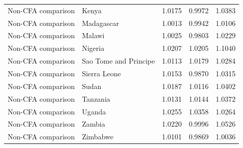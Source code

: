 \begin{table}
\begin{tabular}[t]{llrrr}
Non-CFA comparison & Kenya & 1.0175 & 0.9972 & 1.0383\\
\addlinespace
Non-CFA comparison & Madagascar & 1.0013 & 0.9942 & 1.0106\\
Non-CFA comparison & Malawi & 1.0025 & 0.9803 & 1.0229\\
Non-CFA comparison & Nigeria & 1.0207 & 1.0205 & 1.1040\\
Non-CFA comparison & Sao Tome and Principe & 1.0113 & 1.0179 & 1.0284\\
Non-CFA comparison & Sierra Leone & 1.0153 & 0.9870 & 1.0315\\
\addlinespace
Non-CFA comparison & Sudan & 1.0187 & 1.0116 & 1.0402\\
Non-CFA comparison & Tanzania & 1.0131 & 1.0144 & 1.0372\\
Non-CFA comparison & Uganda & 1.0255 & 1.0358 & 1.0264\\
Non-CFA comparison & Zambia & 1.0220 & 0.9996 & 1.0526\\
Non-CFA comparison & Zimbabwe & 1.0101 & 0.9869 & 1.0036\\
\bottomrule
\end{tabular}
\end{table}